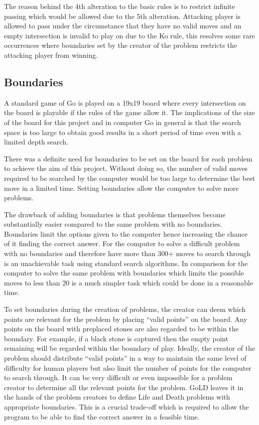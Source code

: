 \documentclass{l4proj}
\begin{document}
\bigskip
The reason behind the 4th alteration to the basic rules is to restrict infinite passing which would be allowed due to the 5th alteration. Attacking player is allowed to pass under the circumstance that they have no valid moves and an empty intersection is invalid to play on due to the Ko rule, this resolves some rare occurrences where boundaries set by the creator of the problem restricts the attacking player from winning.

\subsection{Boundaries}
A standard game of Go is played on a 19x19 board where every intersection on the board is playable if the rules of the game allow it. The implications of the size of the board for this project and in computer Go in general is that the search space is too large to obtain good results in a short period of time even with a limited depth search.

There was a definite need for boundaries to be set on the board for each problem to achieve the aim of this project. Without doing so, the number of valid moves required to be searched by the computer would be too large to determine the best move in a limited time. Setting boundaries allow the computer to solve more problems.

The drawback of adding boundaries is that problems themselves become substantially easier compared to the same problem with no boundaries. Boundaries limit the options given to the computer hence increasing the chance of it finding the correct answer. For the computer to solve a difficult problem with no boundaries and therefore have more than 300+ moves to search through is an unachievable task using standard search algorithms. In comparison for the computer to solve the same problem with boundaries which limits the possible moves to less than 20 is a much simpler task which could be done in a reasonable time.

To set boundaries during the creation of problems, the creator can deem which points are relevant for the problem by placing “valid points” on the board. Any points on the board with preplaced stones are also regarded to be within the boundary. For example, if a black stone is captured then the empty point remaining will be regarded within the boundary of play. Ideally, the creator of the problem should distribute “valid points” in a way to maintain the same level of difficulty for human players but also limit the number of points for the computer to search through. It can be very difficult or even impossible for a problem creator to determine all the relevant points for the problem. GoLD leaves it in the hands of the problem creators to define Life and Death problems with appropriate boundaries. This is a crucial trade-off which is required to allow the program to be able to find the correct answer in a feasible time.
\end{document}

